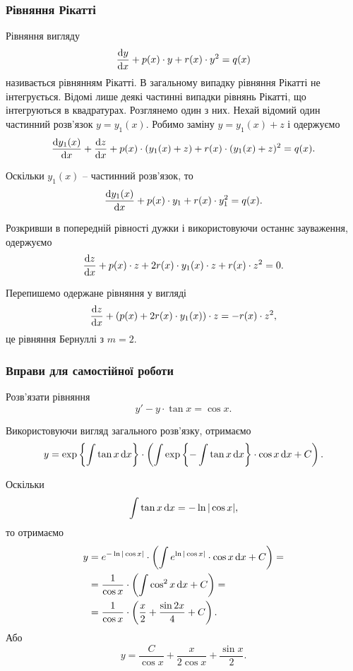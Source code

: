 \subsubsection{Рівняння Рікатті}

Рівняння вигляду 
\begin{equation*}
	\frac{\mathop{}\!\mathrm{d} y}{\mathop{}\!\mathrm{d} x} + p(x) \cdot y + r(x) \cdot y^2 = q(x)
\end{equation*} 
називається рівнянням Рікатті. В загальному випадку рівняння Рікатті не інтегрується. Відомі лише деякі частинні випадки рівнянь Рікатті, що інтегруються в квадратурах. Розглянемо один з них. Нехай відомий один частинний розв’язок $y = y_1(x)$. Робимо заміну $y = y_1(x) + z$ і одержуємо
\begin{equation*}
	\frac{\mathop{}\!\mathrm{d} y_1(x)}{\mathop{}\!\mathrm{d} x} + \frac{\mathop{}\!\mathrm{d} z}{\mathop{}\!\mathrm{d} x} + p(x) \cdot (y_1(x) + z) + r(x) \cdot (y_1(x) + z)^2 = q(x).
\end{equation*}

Оскільки $y_1(x)$ -- частинний розв’язок, то
\begin{equation*}
	\frac{\mathop{}\!\mathrm{d} y_1(x)}{\mathop{}\!\mathrm{d} x} + p(x) \cdot y_1 + r(x) \cdot y_1^2 = q(x).
\end{equation*}

Розкривши в попередній рівності дужки і використовуючи останнє зауваження, одержуємо
\begin{equation*}
	\frac{\mathop{}\!\mathrm{d} z}{\mathop{}\!\mathrm{d} x} + p(x) \cdot z + 2 r(x) \cdot y_1(x) \cdot z + r(x) \cdot z^2 = 0.
\end{equation*}

Перепишемо одержане рівняння у вигляді
\begin{equation*}
	\frac{\mathop{}\!\mathrm{d} z}{\mathop{}\!\mathrm{d} x} + \left(p(x) + 2 r(x) \cdot y_1(x)\right) \cdot z = - r(x) \cdot z^2 ,
\end{equation*}
це рівняння Бернуллі з $m = 2$.

\subsubsection{Вправи для самостійної роботи}

\begin{example}
	Розв’язати рівняння \[ y' - y \cdot \tan x = \cos x.\]
\end{example}
\begin{solution}
	Використовуючи вигляд загального розв’язку, отримаємо
	\[ y = \exp\left\{\int \tan x \mathop{}\!\mathrm{d} x\right\} \cdot \left(\int \exp\left\{-\int\tan x\mathop{}\!\mathrm{d} x\right\}\cdot \cos x \mathop{}\!\mathrm{d} x+C\right). \]

	Оскільки \[\int \tan x \mathop{}\!\mathrm{d} x = - \ln |\cos x|,\] то отримаємо
	\begin{align*}
		y &= e^{-\ln|\cos x|} \cdot \left(\int e^{\ln|\cos x|} \cdot \cos x \mathop{}\!\mathrm{d} x+C\right) = \\
		&= \frac{1}{\cos x} \cdot \left( \int \cos^2 x \mathop{}\!\mathrm{d} x + C \right) = \\
		&= \frac{1}{\cos x} \cdot \left( \frac x2 + \frac{\sin 2x}{4} + C \right).
	\end{align*}
	Або
	\[ y = \frac{C}{\cos x} + \frac{x}{2 \cos x} + \frac{\sin x}{2}. \]
\end{solution}

